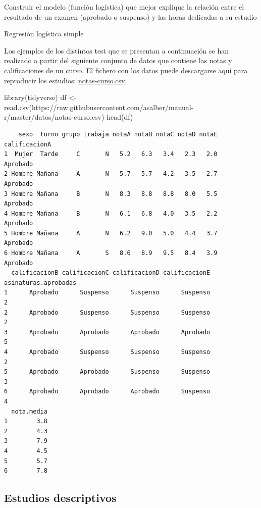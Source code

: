 \documentclass[
  a4paper,
]{scrreport}
\newenvironment{Shaded}{\begin{snugshade}}{\end{snugshade}}
\newcommand{\FunctionTok}[1]{\textcolor[rgb]{0.28,0.35,0.67}{#1}}
\newcommand{\NormalTok}[1]{\textcolor[rgb]{0.00,0.23,0.31}{#1}}
\newcommand{\OtherTok}[1]{\textcolor[rgb]{0.00,0.23,0.31}{#1}}
\newcommand{\StringTok}[1]{\textcolor[rgb]{0.13,0.47,0.30}{#1}}
\theoremstyle{definition}
\theoremstyle{definition}
\theoremstyle{remark}
\begin{document}
Construir el modelo (función logística) que mejor explique la relación
entre el resultado de un examen (aprobado o suspenso) y las horas
dedicadas a su estudio

Regresión logística simple

Los ejemplos de los distintos test que se presentan a continuación se
han realizado a partir del siguiente conjunto de datos que contiene las
notas y calificaciones de un curso. El fichero con los datos puede
descargarse aquí para reproducir los estudios:
\href{https://raw.githubusercontent.com/asalber/manual-r/master/datos/notas-curso.csv}{notas-curso.csv}.

\begin{Shaded}
\begin{Highlighting}[]
\FunctionTok{library}\NormalTok{(tidyverse)}
\NormalTok{df }\OtherTok{\textless{}{-}} \FunctionTok{read.csv}\NormalTok{(}\StringTok{\textquotesingle{}https://raw.githubusercontent.com/asalber/manual{-}r/master/datos/notas{-}curso.csv\textquotesingle{}}\NormalTok{)}
\FunctionTok{head}\NormalTok{(df)}
\end{Highlighting}
\end{Shaded}

\begin{verbatim}
    sexo  turno grupo trabaja notaA notaB notaC notaD notaE calificacionA
1  Mujer  Tarde     C       N   5.2   6.3   3.4   2.3   2.0      Aprobado
2 Hombre Mañana     A       N   5.7   5.7   4.2   3.5   2.7      Aprobado
3 Hombre Mañana     B       N   8.3   8.8   8.8   8.0   5.5      Aprobado
4 Hombre Mañana     B       N   6.1   6.8   4.0   3.5   2.2      Aprobado
5 Hombre Mañana     A       N   6.2   9.0   5.0   4.4   3.7      Aprobado
6 Hombre Mañana     A       S   8.6   8.9   9.5   8.4   3.9      Aprobado
  calificacionB calificacionC calificacionD calificacionE asinaturas.aprobadas
1      Aprobado      Suspenso      Suspenso      Suspenso                    2
2      Aprobado      Suspenso      Suspenso      Suspenso                    2
3      Aprobado      Aprobado      Aprobado      Aprobado                    5
4      Aprobado      Suspenso      Suspenso      Suspenso                    2
5      Aprobado      Aprobado      Suspenso      Suspenso                    3
6      Aprobado      Aprobado      Aprobado      Suspenso                    4
  nota.media
1        3.8
2        4.3
3        7.9
4        4.5
5        5.7
6        7.8
\end{verbatim}

\hypertarget{estudios-descriptivos}{%
\subsection{Estudios descriptivos}\label{estudios-descriptivos}}
\end{document}
